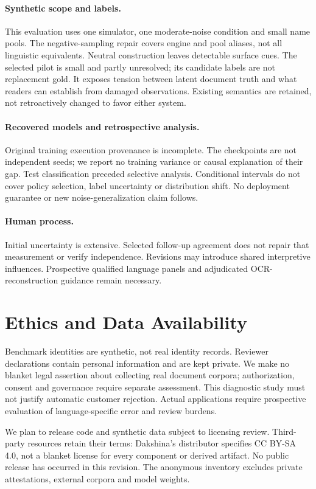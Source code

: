 \documentclass[11pt]{article}
\begin{document}
\paragraph{Synthetic scope and labels.}
This evaluation uses one simulator, one moderate-noise condition and small name
pools. The negative-sampling repair covers engine and pool aliases, not all
linguistic equivalents. Neutral construction leaves detectable surface cues.
The selected pilot is small and partly unresolved; its candidate labels are not
replacement gold. It exposes tension between latent document truth and what
readers can establish from damaged observations. Existing semantics are retained,
not retroactively changed to favor either system.
\paragraph{Recovered models and retrospective analysis.}
Original training execution provenance is incomplete. The checkpoints are not
independent seeds; we report no training variance or causal explanation of their
gap. Test classification preceded selective analysis. Conditional intervals do
not cover policy selection, label uncertainty or distribution shift. No
deployment guarantee or new noise-generalization claim follows.
\paragraph{Human process.}
Initial uncertainty is extensive. Selected follow-up agreement does not repair
that measurement or verify independence. Revisions may introduce shared
interpretive influences. Prospective qualified language panels and adjudicated
OCR-reconstruction guidance remain necessary.

\section*{Ethics and Data Availability}
Benchmark identities are synthetic, not real identity records. Reviewer
declarations contain personal information and are kept private. We make no
blanket legal assertion about collecting real document corpora; authorization,
consent and governance require separate assessment. This diagnostic study must
not justify automatic customer rejection. Actual applications require
prospective evaluation of language-specific error and review burdens.

We plan to release code and synthetic data subject to licensing review.
Third-party resources retain their terms: Dakshina's distributor specifies
CC BY-SA 4.0, not a blanket license for every component or derived artifact.
No public release has occurred in this revision. The anonymous inventory
excludes private attestations, external corpora and model weights.
\end{document}
